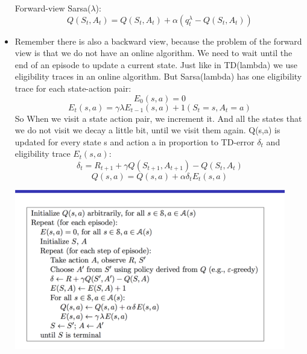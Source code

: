 \documentclass[a4paper]{article}
\begin{document}
\begin{itemize}
\newline
Forward-view Sarsa($\lambda$):
$$Q(S_t, A_t) = Q(S_t, A_t) + \alpha (q_t^{\lambda} - Q(S_t,A_t))$$
\item Remember there is also a backward view, because the problem of the forward view is that we do not have an online algorithm. We need to wait until the end of an episode to update a current state. Just like in TD(lambda) we use eligibility traces in an online algorithm. But Sarsa(lambda) has one eligibility trace for each state-action pair: $$E_0(s,a) = 0$$ $$ E_t(s,a) = \gamma \lambda  E_{t-1}(s,a) + 1(S_t = s, A_t = a)$$ \newline
So When we visit a state action pair, we increment it. And all the states that we do not visit we decay a little bit, until we visit them again. Q(s,a) is updated for every state s and action a in proportion to TD-error $\delta_t$ and eligibility trace $E_t(s,a)$: 
$$ \delta_t = R_{t+1} + \gamma Q(S_{t+1}, A_{t+1}) - Q(S_t, A_t)$$ $$Q(s,a) = Q(s,a) + \alpha \delta_t E_t(s,a)$$


\begin{center}
\includegraphics[width = \textwidth, height=7cm]{images/sarsa_lambda.png}
\end{center}


\end{itemize}
\end{document}

